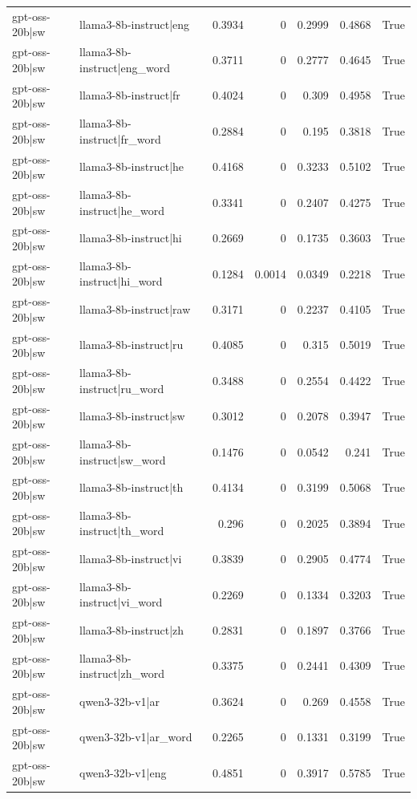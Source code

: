 \begin{table}
\begin{tabular}{l l r r r r l}
gpt-oss-20b|sw & llama3-8b-instruct|eng & 0.3934 & 0 & 0.2999 & 0.4868 & True \\
gpt-oss-20b|sw & llama3-8b-instruct|eng_word & 0.3711 & 0 & 0.2777 & 0.4645 & True \\
gpt-oss-20b|sw & llama3-8b-instruct|fr & 0.4024 & 0 & 0.309 & 0.4958 & True \\
gpt-oss-20b|sw & llama3-8b-instruct|fr_word & 0.2884 & 0 & 0.195 & 0.3818 & True \\
gpt-oss-20b|sw & llama3-8b-instruct|he & 0.4168 & 0 & 0.3233 & 0.5102 & True \\
gpt-oss-20b|sw & llama3-8b-instruct|he_word & 0.3341 & 0 & 0.2407 & 0.4275 & True \\
gpt-oss-20b|sw & llama3-8b-instruct|hi & 0.2669 & 0 & 0.1735 & 0.3603 & True \\
gpt-oss-20b|sw & llama3-8b-instruct|hi_word & 0.1284 & 0.0014 & 0.0349 & 0.2218 & True \\
gpt-oss-20b|sw & llama3-8b-instruct|raw & 0.3171 & 0 & 0.2237 & 0.4105 & True \\
gpt-oss-20b|sw & llama3-8b-instruct|ru & 0.4085 & 0 & 0.315 & 0.5019 & True \\
gpt-oss-20b|sw & llama3-8b-instruct|ru_word & 0.3488 & 0 & 0.2554 & 0.4422 & True \\
gpt-oss-20b|sw & llama3-8b-instruct|sw & 0.3012 & 0 & 0.2078 & 0.3947 & True \\
gpt-oss-20b|sw & llama3-8b-instruct|sw_word & 0.1476 & 0 & 0.0542 & 0.241 & True \\
gpt-oss-20b|sw & llama3-8b-instruct|th & 0.4134 & 0 & 0.3199 & 0.5068 & True \\
gpt-oss-20b|sw & llama3-8b-instruct|th_word & 0.296 & 0 & 0.2025 & 0.3894 & True \\
gpt-oss-20b|sw & llama3-8b-instruct|vi & 0.3839 & 0 & 0.2905 & 0.4774 & True \\
gpt-oss-20b|sw & llama3-8b-instruct|vi_word & 0.2269 & 0 & 0.1334 & 0.3203 & True \\
gpt-oss-20b|sw & llama3-8b-instruct|zh & 0.2831 & 0 & 0.1897 & 0.3766 & True \\
gpt-oss-20b|sw & llama3-8b-instruct|zh_word & 0.3375 & 0 & 0.2441 & 0.4309 & True \\
gpt-oss-20b|sw & qwen3-32b-v1|ar & 0.3624 & 0 & 0.269 & 0.4558 & True \\
gpt-oss-20b|sw & qwen3-32b-v1|ar_word & 0.2265 & 0 & 0.1331 & 0.3199 & True \\
gpt-oss-20b|sw & qwen3-32b-v1|eng & 0.4851 & 0 & 0.3917 & 0.5785 & True \\

\end{tabular}
\end{table}
